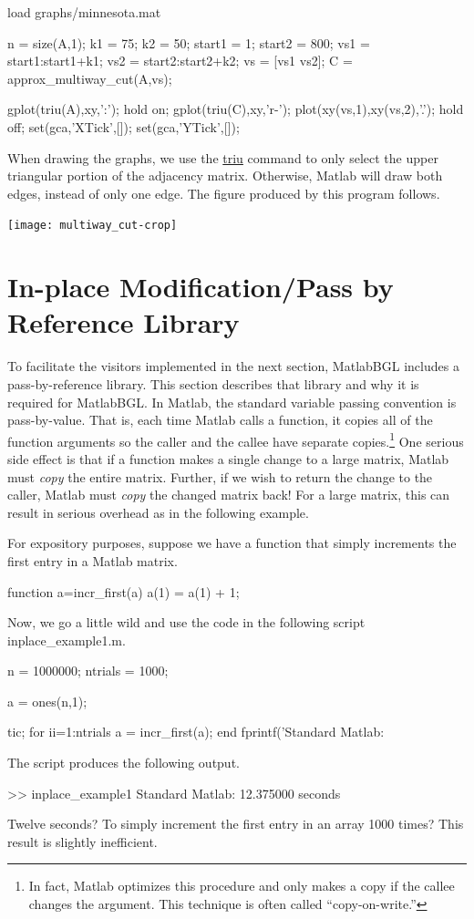 \documentclass[12pt]{article}
\newcommand{\mycmd}[1]{\url{#1}}
\newcommand{\mypath}[1]{{\ttfamily \small #1}}
\begin{document}
\begin{mcode}
load graphs/minnesota.mat

n = size(A,1);
k1 = 75;
k2 = 50;
start1 = 1;
start2 = 800;
vs1 = start1:start1+k1;
vs2 = start2:start2+k2;
vs = [vs1 vs2];
C = approx_multiway_cut(A,vs);

gplot(triu(A),xy,':');
hold on;
gplot(triu(C),xy,'r-');
plot(xy(vs,1),xy(vs,2),'.');
hold off;
set(gca,'XTick',[]);
set(gca,'YTick',[]);
\end{mcode}

When drawing the graphs, we use the \mycmd{triu} command to only select the upper triangular portion of the adjacency matrix.  Otherwise, Matlab will draw both edges, instead of only one edge.  The figure produced by this program follows.

\begin{center}
\texttt{[image: multiway\_cut-crop]}
\end{center}

\section{In-place Modification/Pass by Reference Library}

To facilitate the visitors implemented in the next section, MatlabBGL includes a pass-by-reference library.  This section describes that library and why it is required for MatlabBGL.  In Matlab, the standard variable passing convention is pass-by-value.  That is, each time Matlab calls a function, it copies all of the function arguments so the caller and the callee have separate copies.\footnote{In fact, Matlab optimizes this procedure and only makes a copy if the callee changes the argument.  This technique is often called ``copy-on-write.''}  One serious side effect is that if a function makes a single change to a large matrix, Matlab must \emph{copy} the entire matrix.  Further, if we wish to return the change to the caller, Matlab must \emph{copy} the changed matrix back!  For a large matrix, this can result in serious overhead as in the following example.

For expository purposes, suppose we have a function that simply increments the first entry in a Matlab matrix.
\begin{mcode}
function a=incr_first(a)
a(1) = a(1) + 1;
\end{mcode}
Now, we go a little wild and use the code in the following script \mypath{inplace\_example1.m}.
\begin{mcode}
n = 1000000;
ntrials = 1000;

a = ones(n,1);

tic;
for ii=1:ntrials
    a = incr_first(a);
end
fprintf('Standard Matlab: %
\end{mcode}
The script produces the following output.
\begin{mcode}
>> inplace_example1
Standard Matlab: 12.375000 seconds
\end{mcode}
Twelve seconds?  To simply increment the first entry in an array 1000 times?  This result is slightly inefficient.
\end{document}

